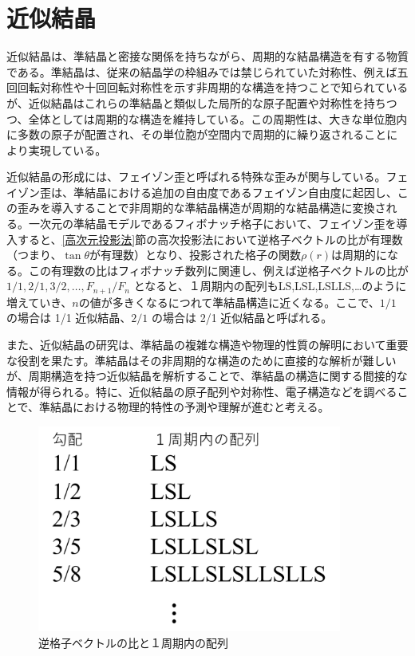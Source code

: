 \documentclass[11pt,a4j]{jreport}
\begin{document}
\section{近似結晶}
近似結晶は、準結晶と密接な関係を持ちながら、周期的な結晶構造を有する物質である。準結晶は、従来の結晶学の枠組みでは禁じられていた対称性、例えば五回回転対称性や十回回転対称性を示す非周期的な構造を持つことで知られているが、近似結晶はこれらの準結晶と類似した局所的な原子配置や対称性を持ちつつ、全体としては周期的な構造を維持している。この周期性は、大きな単位胞内に多数の原子が配置され、その単位胞が空間内で周期的に繰り返されることにより実現している。\par
近似結晶の形成には、フェイゾン歪と呼ばれる特殊な歪みが関与している。フェイゾン歪は、準結晶における追加の自由度であるフェイゾン自由度に起因し、この歪みを導入することで非周期的な準結晶構造が周期的な結晶構造に変換される。一次元の準結晶モデルであるフィボナッチ格子において、フェイゾン歪を導入すると、\ref{高次元投影法}節の高次投影法において逆格子ベクトルの比が有理数（つまり、$\tan \theta$が有理数）となり、投影された格子の関数$\rho(r)$は周期的になる。この有理数の比はフィボナッチ数列に関連し、例えば逆格子ベクトルの比が $1/1, 2/1, 3/2,\dots,F_{n+1}/F_n$ となると、１周期内の配列もLS,LSL,LSLLS,…のように増えていき、$n$の値が多きくなるにつれて準結晶構造に近くなる。ここで、$1/1$ の場合は 1/1 近似結晶、$2/1$ の場合は 2/1 近似結晶と呼ばれる。\par
また、近似結晶の研究は、準結晶の複雑な構造や物理的性質の解明において重要な役割を果たす。準結晶はその非周期的な構造のために直接的な解析が難しいが、周期構造を持つ近似結晶を解析することで、準結晶の構造に関する間接的な情報が得られる。特に、近似結晶の原子配列や対称性、電子構造などを調べることで、準結晶における物理的特性の予測や理解が進むと考える。

\begin{figure}[htbp]
  \centering
  \vspace{10mm}
  \includegraphics[width=100mm]{./figure/LS.png}
  \caption{逆格子ベクトルの比と１周期内の配列}
  \label{LS}
\end{figure}
\end{document}
